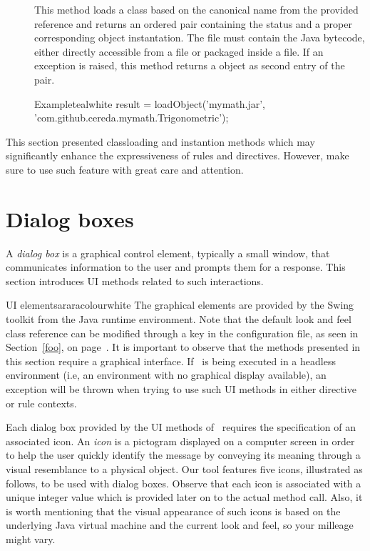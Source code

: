 \begin{description}
\item[] This method loads a class based on the canonical name from the provided  reference and returns an ordered pair containing the status and a proper corresponding object instantation. The file must contain the Java bytecode, either directly accessible from a  file or packaged inside a  file. If an exception is raised, this method returns a  object as second entry of the pair.

\begin{codebox}{Example}{teal}{\icnote}{white}
result = loadObject('mymath.jar',
         'com.github.cereda.mymath.Trigonometric');
\end{codebox}
\end{description}

This section presented classloading and instantion methods which may significantly enhance the expressiveness of rules and directives. However, make sure to use such feature with great care and attention.

\section{Dialog boxes}
\label{sec:dialogboxes}

A \emph{dialog box} is a graphical control element, typically a small window, that communicates information to the user and prompts them for a response. This section introduces UI methods related to such interactions.

\begin{messagebox}{UI elements}{araracolour}{\icok}{white}
The graphical elements are provided by the Swing toolkit from the Java runtime environment. Note that the default look and feel class reference can be modified through a key in the configuration file, as seen in Section~\ref{foo}, on page~\pageref{foo}. It is important to observe that the methods presented in this section require a graphical interface. If \arara\ is being executed in a headless environment (i.e, an environment with no graphical display available), an exception will be thrown when trying to use such UI methods in either directive or rule contexts.
\end{messagebox}

Each dialog box provided by the UI methods of \arara\ requires the specification of an associated icon. An \emph{icon} is a pictogram displayed on a computer screen in order to help the user quickly identify the message by conveying its meaning through a visual resemblance to a physical object. Our tool features five icons, illustrated as follows, to be used with dialog boxes. Observe that each icon is associated with a unique integer value which is provided later on to the actual method call. Also, it is worth mentioning that the visual appearance of such icons is based on the underlying Java virtual machine and the current look and feel, so your milleage might vary.

